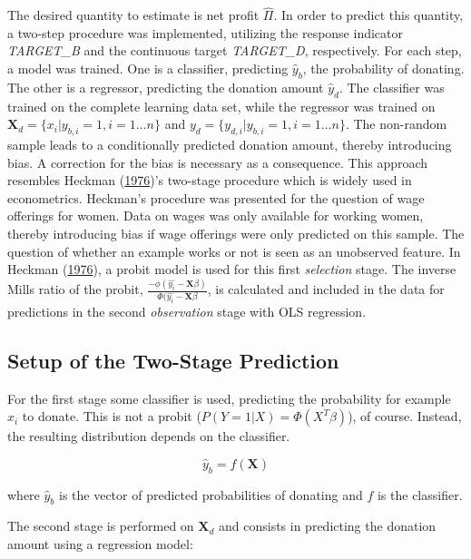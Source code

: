 \documentclass[
  11pt,
  a4paper,
  DIV=12,captions=tableheading,oneside,titlepage]{scrbook}
\begin{document}
The desired quantity to estimate is net profit \(\hat{\Pi}\). In order to predict this quantity, a two-step procedure was implemented, utilizing the response indicator \emph{TARGET\_B} and the continuous target \emph{TARGET\_D}, respectively. For each step, a model was trained. One is a classifier, predicting \(\hat{y}_b\), the probability of donating. The other is a regressor, predicting the donation amount \(\hat{y}_d\). The classifier was trained on the complete learning data set, while the regressor was trained on \(\mathbf{X}_d = \{x_i|y_{b,i} = 1, i=1 \ldots n\}\) and \(y_d = \{y_{d,i}|y_{b,i} = 1, i=1 \ldots n\}\). The non-random sample leads to a conditionally predicted donation amount, thereby introducing bias. A correction for the bias is necessary as a consequence. This approach resembles Heckman (\protect\hyperlink{ref-heckman1976common}{1976})'s two-stage procedure which is widely used in econometrics. Heckman's procedure was presented for the question of wage offerings for women. Data on wages was only available for working women, thereby introducing bias if wage offerings were only predicted on this sample. The question of whether an example works or not is seen as an unobserved feature. In Heckman (\protect\hyperlink{ref-heckman1976common}{1976}), a probit model is used for this first \emph{selection} stage. The inverse Mills ratio of the probit, \(\frac{-\phi(\hat{y_i}-\mathbf{X}\beta)}{\Phi(\hat{y_i}-\mathbf{X}\beta}\), is calculated and included in the data for predictions in the second \emph{observation} stage with OLS regression.

\hypertarget{setup-of-the-two-stage-prediction}{%
\subsection{Setup of the Two-Stage Prediction}\label{setup-of-the-two-stage-prediction}}

For the first stage some classifier is used, predicting the probability for example \(x_i\) to donate. This is not a probit (\(P(Y=1|X) = \Phi(X^T\beta)\)), of course. Instead, the resulting distribution depends on the classifier.

\begin{equation}
\hat{y}_b = f(\mathbf{X})
\label{eq:y-b}
\end{equation}

where \(\hat{y}_b\) is the vector of predicted probabilities of donating and \(f\) is the classifier.

The second stage is performed on \(\mathbf{X}_d\) and consists in predicting the donation amount using a regression model:
\end{document}
